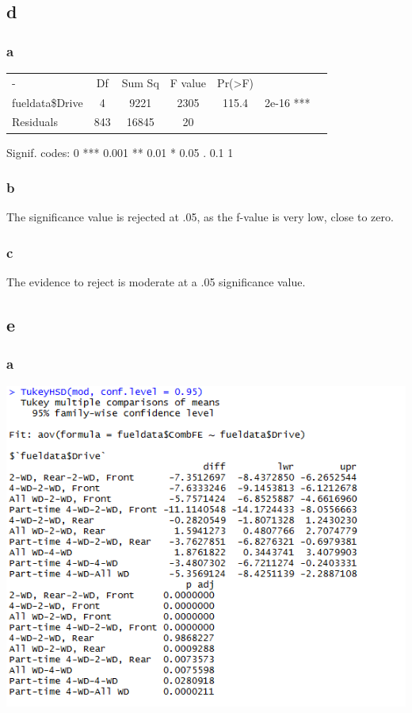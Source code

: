 \documentclass[10pt,letterpaper]{article}
\begin{document}
\subsection*{d}
\subsubsection*{a}
\begin{center}
         \begin{tabular}{l | c | c | c | c | c | r}
		 - & Df & Sum Sq & F value & Pr(>F) &  &  \\
		 fueldata\$Drive & 4 & 9221 & 2305 & 115.4 & 2e-16 *** \\
		 Residuals & 843 & 16845  & 20 &  &  &  \\ 
         \end{tabular}
\end{center}
Signif. codes:  0 *** 0.001 ** 0.01 * 0.05 . 0.1   1

\subsubsection*{b}
The significance value is rejected at .05, as the f-value is very low, close
to zero.

\subsubsection*{c}
The evidence to reject is moderate at a .05 significance value.

\subsection*{e}
\subsubsection*{a}
\includegraphics[scale=1.0]{turkey}\\
\end{document}
